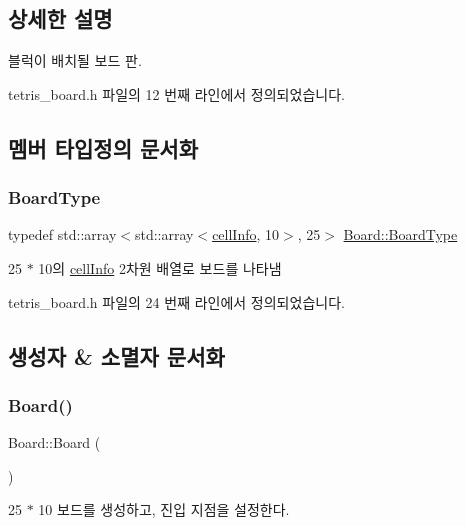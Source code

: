 \subsection{상세한 설명}
블럭이 배치될 보드 판. 

tetris\+\_\+board.\+h 파일의 12 번째 라인에서 정의되었습니다.



\subsection{멤버 타입정의 문서화}
\mbox{\label{class_board_a84bf794bc185e31e333b78bb003c4bc3}} 
\subsubsection{\texorpdfstring{Board\+Type}{BoardType}}
{\footnotesize\ttfamily typedef std\+::array$<$std\+::array$<$\mbox{\hyperlink{struct_board_1_1cell_info}{cell\+Info}}, 10$>$, 25$>$ \mbox{\hyperlink{class_board_a84bf794bc185e31e333b78bb003c4bc3}{Board\+::\+Board\+Type}}}



25 $\ast$ 10의 \mbox{\hyperlink{struct_board_1_1cell_info}{cell\+Info}} 2차원 배열로 보드를 나타냄 



tetris\+\_\+board.\+h 파일의 24 번째 라인에서 정의되었습니다.



\subsection{생성자 \& 소멸자 문서화}
\mbox{\label{class_board_a9ee491d4fea680cf69b033374a9fdfcb}} 
\subsubsection{\texorpdfstring{Board()}{Board()}}
{\footnotesize\ttfamily Board\+::\+Board (\begin{DoxyParamCaption}{ }\end{DoxyParamCaption})\hspace{0.3cm}{\ttfamily [inline]}}



25 $\ast$ 10 보드를 생성하고, 진입 지점을 설정한다. 



